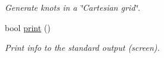 \begin{CompactItemize}
\begin{CompactList}\small\item\em Generate knots in a \char`\"{}Cartesian grid\char`\"{}. \item\end{CompactList}\item 
\hypertarget{classSemiCircleKnots_88cbdd7e8d1246bf90bfaf3c19603d60}{
bool \hyperlink{classSemiCircleKnots_88cbdd7e8d1246bf90bfaf3c19603d60}{print} ()}
\label{classSemiCircleKnots_88cbdd7e8d1246bf90bfaf3c19603d60}

\begin{CompactList}\small\item\em Print info to the standard output (screen). \item\end{CompactList}\end{CompactItemize}
